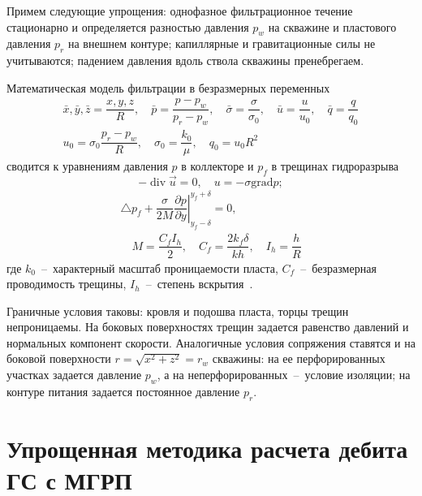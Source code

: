 \documentclass{article}
\begin{document}
Примем следующие упрощения: однофазное фильтрационное течение стационарно
и определяется разностью давления $p_w$ на скважине и пластового давления
$p_r$ на внешнем контуре; капиллярные и гравитационные силы не учитываются;
падением давления вдоль ствола скважины пренебрегаем.

Математическая модель фильтрации в безразмерных переменных
\begin{equation}
  \displaystyle
  \begin{gathered}
    \bar{x},\bar{y},\bar{z} = \dfrac{x,y,z}{R}, \quad
    \bar{p} = \dfrac{p - p_w}{p_r - p_w}, \quad
    \bar{\sigma} = \dfrac{\sigma}{\sigma_0}, \quad
    \bar{u}=\dfrac{u}{u_0},  \quad
    \bar{q} = \dfrac{q}{q_0}    \\
    u_0 = \sigma_0 \dfrac{p_r - p_w}{R}, \quad
    \sigma_0 = \dfrac{k_0}{\mu}, \quad
    q_0 = u_0 R^2
  \end{gathered}
  \label{eq:kham_dimless}
\end{equation}
сводится  к уравнениям  давления $p$ в коллекторе и $p_f$ в трещинах
гидроразрыва~\cite{lit:kham_mazo_uzku_2015}
\begin{equation}
  \displaystyle
  - \operatorname{div} \vec{u} = 0,
  \quad u=-\sigma \text{grad} p;
  \label{eq:kham_main_p_res}
\end{equation}
\begin{equation}
  \displaystyle
  \begin{gathered}
    \triangle p_f + \dfrac{\sigma}{2M}\left.\dfrac{\partial p}{\partial y} \right|_{y_f - \delta}^{y_f + \delta} = 0, \\[8pt]
    \quad M = \dfrac{C_f I_h}{2}, \quad C_f = \dfrac{2 k_f \delta}{k h}, \quad I_h=\dfrac{h}{R}
  \end{gathered}
  \label{eq:kham_main_p_fract}
\end{equation}
где $k_0$~--~характерный масштаб проницаемости пласта, $C_f$~--~безразмерная проводимость трещины, $I_h$~--~степень
вскрытия~\cite{lit:kham_valko_economides_2001}.

Граничные условия таковы: кровля и подошва пласта, торцы трещин
непроницаемы. На боковых поверхностях трещин задается равенство давлений и
нормальных компонент скорости. Аналогичные условия сопряжения ставятся и на
боковой поверхности $r=\sqrt{x^2 + z^2} = r_w$ скважины: на ее перфорированных участках задается давление $p_w$, а на неперфорированных~--~условие изоляции; на контуре питания задается постоянное давление $p_r$.

\section{Упрощенная методика расчета дебита ГС с МГРП}
\end{document}
